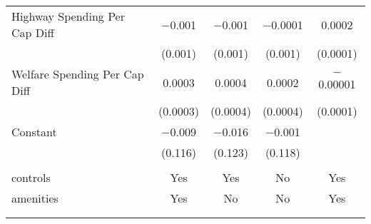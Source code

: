 \begin{table}[!htbp]
\begin{tabular}{@{\extracolsep{5pt}}lcccc}
  Highway Spending Per Cap Diff & $-$0.001 & $-$0.001 & $-$0.0001 & 0.0002 \\ 
  & (0.001) & (0.001) & (0.001) & (0.0001) \\ 
  Welfare Spending Per Cap Diff & 0.0003 & 0.0004 & 0.0002 & $-$0.00001 \\ 
  & (0.0003) & (0.0004) & (0.0004) & (0.0001) \\ 
  Constant & $-$0.009 & $-$0.016 & $-$0.001 &  \\ 
  & (0.116) & (0.123) & (0.118) &  \\ 
 \hline \\[-1.8ex] 
controls & Yes & Yes & No & Yes \\ 
amenities & Yes & No & No & Yes \\ 
\hline \\[-1.8ex] 
\hline 
\hline \\[-1.8ex] 
\end{tabular} 
\end{table} 
